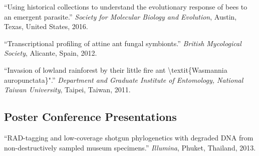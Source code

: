 \documentclass[11pt]{article}
\def\printdate#1{\xprintdate#1-}
\def\xprintdate#1-#2-#3-{#1}
\begin{document}
\ind ``Using historical collections to understand the evolutionary response of
bees to an emergent parasite.'' \emph{Society for Molecular Biology and Evolution}, Austin, Texas, United States, \printdate{2016-00-00}.




























\ind ``Transcriptional profiling of attine ant fungal symbionts.'' \emph{British Mycological Society}, Alicante, Spain, \printdate{2012-00-00}.


\ind ``Invasion of lowland rainforest by their little fire ant
\textbackslash{}textit\{Wasmannia auropunctata\}".'' \emph{Department and Graduate Institute of Entomology, National Taiwan
University}, Taipei, Taiwan, \printdate{2011-00-00}.








\subsection{Poster Conference Presentations}





























\ind ``RAD-tagging and low-coverage shotgun phylogenetics with degraded DNA
from non-destructively sampled museum specimens.'' \emph{Illumina}, Phuket, Thailand, \printdate{2013-00-00}.
\end{document}
